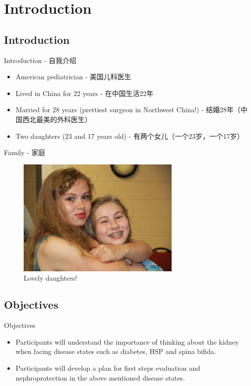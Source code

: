 \section{Introduction}\label{introduction}

\subsection{Introduction}\label{introduction-1}

\begin{frame}{Introduction - 自我介绍}

\begin{itemize}
\itemsep1pt\parskip0pt
\item
  American pediatrician - 美国儿科医生
\item
  Lived in China for 22 years - 在中国生活22年
\item
  Married for 28 years (prettiest surgeon in Northwest China!) -
  结婚28年（中国西北最美的外科医生）
\item
  Two daughters (23 and 17 years old) - 有两个女儿（一个23岁，一个17岁）
\end{itemize}

\end{frame}

\begin{frame}{Family - 家庭}

\begin{figure}[htbp]
\centering
\includegraphics{./img/img_0002_300.jpg}
\caption{Lovely daughters!}
\end{figure}

\end{frame}

\subsection{Objectives}\label{objectives}

\begin{frame}{Objectives}

\begin{itemize}
\itemsep1pt\parskip0pt
\item
  Participants will understand the importance of thinking about the
  kidney when facing disease states such as diabetes, HSP and spina
  bifida.
\item
  Participants will develop a plan for first steps evaluation and
  nephroprotection in the above mentioned disease states.
\end{itemize}

\end{frame}

